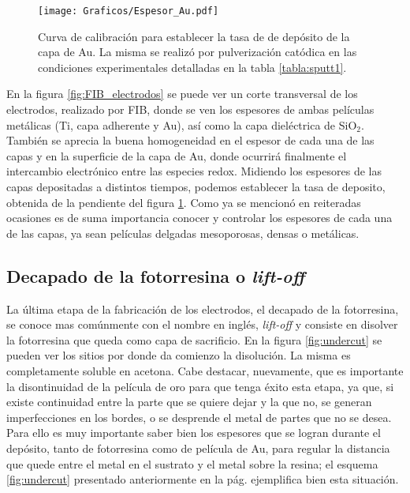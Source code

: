 					   		\begin{figure}[ht!]
					   		\begin{center}
							\texttt{[image: Graficos/Espesor\_Au.pdf]}
							\caption[Curca de calibrado para el espesor de los electrodos]{Curva de calibración para establecer la tasa de de depósito de la capa de Au. La misma se realizó por pulverización catódica en las condiciones experimentales detalladas en la tabla \ref{tabla:sputt1}.}
							\label{fig:calibracionAu}
							\end{center}
							\end{figure}
		
		 En la figura \ref{fig:FIB_electrodos} se puede ver un corte transversal de los electrodos, realizado por FIB, donde se ven los espesores de ambas películas metálicas (Ti, capa adherente y Au), así como la capa dieléctrica de SiO$_2$. También se aprecia la buena homogeneidad en el espesor de cada una de las capas y en la superficie de la capa de Au, donde ocurrirá finalmente el intercambio electrónico entre las especies redox. Midiendo los espesores de las capas depositadas a distintos tiempos, podemos establecer la tasa de deposito, obtenida de la pendiente del figura \ref{fig:calibracionAu}. Como ya se mencionó en reiteradas ocasiones es de suma importancia conocer y controlar los espesores de cada una de las capas, ya sean películas delgadas mesoporosas, densas o metálicas.
		
  		\subsection{Decapado de la fotorresina o\textit{ lift-off}}


		 La última etapa de la fabricación de los electrodos, el decapado de la fotorresina, se conoce mas comúnmente con el nombre en inglés, \textit{lift-off} y consiste en disolver la fotorresina que queda como capa de sacrificio. En la figura \ref{fig:undercut} se pueden ver los sitios por donde da comienzo la disolución. La misma es completamente soluble en acetona. Cabe destacar, nuevamente, que es importante la disontinuidad de la película de oro para que tenga éxito esta etapa, ya que, si existe continuidad entre la parte que se quiere dejar y la que no, se generan imperfecciones en los bordes, o se desprende el metal de partes que no se desea. Para ello es muy importante saber bien los espesores que se logran durante el depósito, tanto de fotorresina como de película de Au, para regular la distancia que quede entre el metal en el sustrato y el metal sobre la resina; el esquema \ref{fig:undercut} presentado anteriormente en la pág. \pageref{fig:undercut} ejemplifica bien esta situación.

